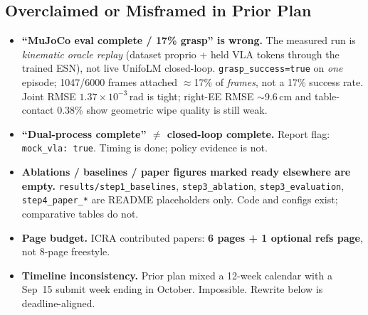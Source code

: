 \documentclass[conference]{IEEEtran}
\begin{document}
\subsection{Overclaimed or Misframed in Prior Plan}
\begin{itemize}
    \item \textbf{``MuJoCo eval complete / 17\% grasp'' is wrong.}
        The measured run is \emph{kinematic oracle replay} (dataset proprio + held VLA tokens through the trained ESN), not live UnifoLM closed-loop.
        \texttt{grasp\_success=true} on \emph{one} episode; 1047/6000 frames attached $\approx$17\% of \emph{frames}, not a 17\% success rate.
        Joint RMSE $1.37\times10^{-3}$\,rad is tight; right-EE RMSE $\sim$9.6\,cm and table-contact 0.38\% show geometric wipe quality is still weak.
    \item \textbf{``Dual-process complete'' $\neq$ closed-loop complete.}
        Report flag: \texttt{mock\_vla: true}. Timing is done; policy evidence is not.
    \item \textbf{Ablations / baselines / paper figures marked ready elsewhere are empty.}
        \texttt{results/step1\_baselines}, \texttt{step3\_ablation}, \texttt{step3\_evaluation}, \texttt{step4\_paper\_*} are README placeholders only.
        Code and configs exist; comparative tables do not.
    \item \textbf{Page budget.}
        ICRA contributed papers: \textbf{6 pages + 1 optional refs page}, not 8-page freestyle.
    \item \textbf{Timeline inconsistency.}
        Prior plan mixed a 12-week calendar with a Sep~15 submit week ending in October. Impossible. Rewrite below is deadline-aligned.
\end{itemize}
\end{document}
